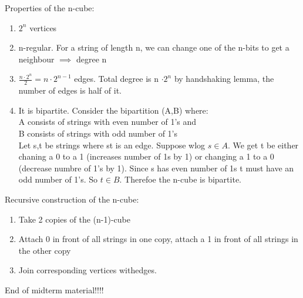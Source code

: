\documentclass[12pt]{article}
\begin{document}
	Properties of the n-cube:
	\begin{enumerate}
		\item $2^n$ vertices
		\item n-regular. For a string of length n, we can change one of the n-bits to get a neighbour $\implies$ degree n
		\item $\frac{n\cdot 2^n}{2} = n \cdot 2^{n-1}$ edges. Total degree is n $\cdot 2^n$ by handshaking lemma, the number of edges is half of it.
		\item It is bipartite. Consider the bipartition (A,B) where:\\
				A consists of strings with even number of 1's and \\
				B consists of strings with odd number of 1's\\
				Let s,t be strings where st is an edge. Suppose wlog $s \in A$. We get t be either chaning a 0 to a 1 (increases number of 1s by 1) or changing a 1 to a 0 (decrease numbre of 1's by 1). Since s has even number of 1s t must have an odd number of 1's. So $t \in B$. Therefoe the n-cube is bipartite.
	\end{enumerate}
	
	Recursive construction of the n-cube:
	\begin{enumerate}
		\item Take 2 copies of the (n-1)-cube
		\item Attach 0 in front of all strings in one copy, attach a 1 in front of all strings in the other copy
		\item Join corresponding vertices withedges.
	\end{enumerate}
	
	End of midterm material!!!!
	
	
	
\end{document}
